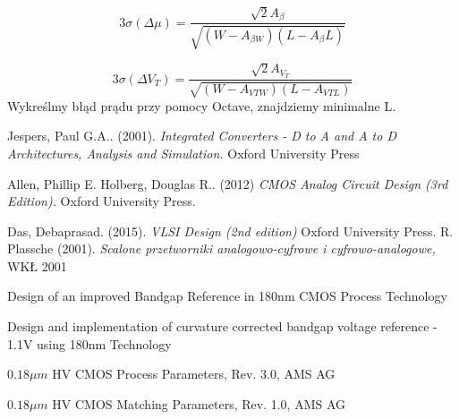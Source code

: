 \documentclass[10pt,a4paper]{report}
\theoremstyle{definition}
\theoremstyle{definition}
\theoremstyle{definition}
\theoremstyle{definition}
\theoremstyle{definition}
\begin{document}
{		\begin{equation}
		3 \sigma \left(\Delta \mu \right) = \frac{ \sqrt{2} A_{\beta}  } { \sqrt{ \left(W-A_{\beta W}\right)\left(L-A_{\beta} L\right)}}
		\end{equation}
		
		\begin{equation}
		3 \sigma \left(\Delta V_T \right) = \frac{ \sqrt{2} A_{V_T}  } { \sqrt{ \left(W-A_{VTW}\right)\left(L-A_{VTL}\right)}}
		\end{equation}
		Wykreślmy błąd prądu przy pomocy Octave, znajdziemy minimalne L.
		
	}
	
	
	
	
	
	\begin{thebibliography}{9}
		Jespers, Paul G.A.. (2001). 
		\textit{Integrated Converters - D to A and A to D Architectures, Analysis and Simulation.}
		Oxford University Press
		
		Allen, Phillip E. Holberg, Douglas R.. (2012)  
		\textit{CMOS Analog Circuit Design (3rd Edition). }
		Oxford University Press.
		
		Das, Debaprasad. (2015).
		\textit{VLSI Design (2nd edition)}
		Oxford University Press.
		R. Plassche (2001). 
		\textit{Scalone przetworniki analogowo-cyfrowe i cyfrowo-analogowe,}
		WKŁ 2001
		
		Design of an improved Bandgap Reference in
		180nm CMOS Process Technology

		Design and implementation of curvature corrected
		bandgap voltage reference - 1.1V using 180nm Technology

		$0.18\mu m$ HV CMOS Process Parameters, Rev. 3.0, AMS AG

		$0.18\mu m$ HV CMOS Matching Parameters, Rev. 1.0, AMS AG
		
	\end{thebibliography}
\end{document}
